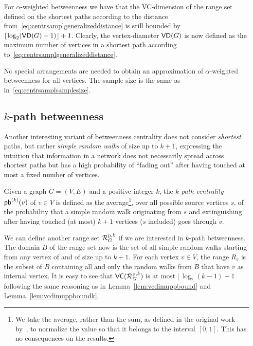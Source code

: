 For $\alpha$-weighted betweenness we have that the VC-dimension of the range set
defined on the shortest paths according to the distance
from~\eqref{eq:centrsamplgeneralizeddistance} is still bounded by
$\lfloor\log_2(\mathsf{VD}(G)-1)\rfloor+1$. Clearly, the vertex-diameter $\mathsf{VD}(G)$ is now
defined as the maximum number of vertices in a shortest path according
to~\eqref{eq:centrsamplgeneralizeddistance}.

No special arrangements are needed to obtain an approximation of
$\alpha$-weighted betweenness for all vertices. The sample size is the same as in~\eqref{eq:centrsamplsamplesize}.

\subsection{$k$-path betweenness}
Another interesting variant of betweenness centrality does not consider
\emph{shortest} paths, but rather \emph{simple random walks} of size up to
$k+1$, expressing the intuition that information in a network does not
necessarily spread across shortest paths but has a high probability of ``fading
out'' after having touched at most a fixed number of vertices.

\begin{definition}\label{def:centrsamplkpathbetweenness}
 Given a graph $G=(V,E)$ and a positive integer $k$, the \emph{$k$-path
 centrality} $\mathsf{pb}^{(k)}(v)$ of $v\in V$ is defined as the average\footnote{We take the
 average, rather than the sum, as defined in the original work
 by~\citet{KourtellisASIT12}, to normalize the value so that it belongs to the interval
 $[0,1]$. This has no consequences on the results.}, over all possible source
 vertices $s$, of the probability that a simple random walk originating from
 $s$ and extinguishing after having touched (at most) $k+1$ vertices ($s$
 included) goes through $v$.
\end{definition}

We can define another range set $\mathcal{R}_G^{\mathrm{p},k}$ if we are interested
in $k$-path betweenness. The domain $B$ of the range set now is the set of all
simple random walks starting from any vertex of and of size up to $k+1$. For
each vertex $v\in V$, the range $R_v$ is the subset of $B$ containing all and
only the random walks from $B$ that have $v$ as internal vertex. It is easy to
see that $\mathsf{VC}(\mathcal{R}_G^{\mathrm{p},k})$ is at most $\lfloor\log_2(k-1)+1$
following the same reasoning as in Lemma~\ref{lem:vcdimuppbound} and
Lemma~\ref{lem:vcdimuppboundk}.

